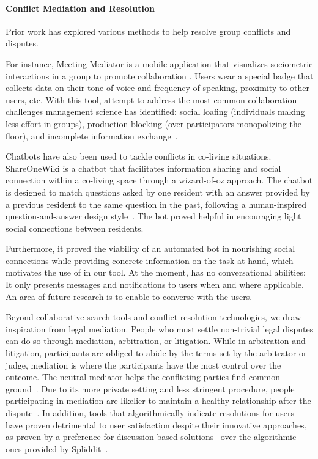 \paragraph{Conflict Mediation and Resolution}

Prior work has explored various methods to help resolve group conflicts and disputes.

For instance, Meeting Mediator is a mobile application that visualizes sociometric interactions in a group to promote collaboration \cite{meetingmediator}. Users wear a special badge that collects data on their tone of voice and frequency of speaking, proximity to other users, etc. With this tool, \citeauthor{meetingmediator} attempt to address the most common collaboration challenges management science has identified: social loafing (individuals making less effort in groups), production blocking (over-participators monopolizing the floor), and incomplete information exchange~\cite{meetingmediator}. 

Chatbots have also been used to tackle conflicts in co-living situations. ShareOneWiki is a chatbot that facilitates information sharing and social connection within a co-living space through a wizard-of-oz approach. The chatbot is designed to match questions asked by one resident with an answer provided by a previous resident to the same question in the past, following a human-inspired question-and-answer design style~\cite{shareonewiki}. The bot proved helpful in encouraging light social connections between residents.

Furthermore, it proved the viability of an automated bot in nourishing social connections while providing concrete information on the task at hand, which motivates the use of \cbot in our tool. At the moment, \cbot has no conversational abilities: It only presents messages and notifications to users when and where applicable. An area of future research is to enable \cbot to converse with the users.  

Beyond collaborative search tools and conflict-resolution technologies, we draw inspiration from legal mediation. People who must settle non-trivial legal disputes can do so through mediation, arbitration, or litigation. While in arbitration and litigation, participants are obliged to abide by the terms set by the arbitrator or judge, mediation is where the participants have the most control over the outcome. The neutral mediator helps the conflicting parties find common ground~\cite{disputeresolutionexplanation1}. Due to its more private setting and less stringent procedure, people participating in mediation are likelier to maintain a healthy relationship after the dispute~\cite{disputeresolutionexplanation2}. In addition, tools that algorithmically indicate resolutions for users have proven detrimental to user satisfaction despite their innovative approaches, as proven by a preference for discussion-based solutions~\cite{algorithmicmediation} over the algorithmic ones provided by Spliddit~\cite{spliddit}. 

